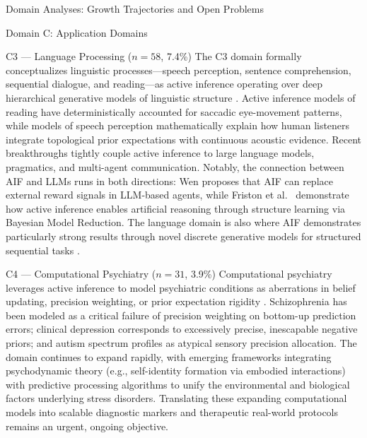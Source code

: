 \documentclass[
  ignorenonframetext,
]{beamer}
\begin{document}
\begin{frame}{Domain Analyses: Growth Trajectories and Open Problems
\label{sec:subfield_analyses}}
\begin{block}{Domain C: Application Domains}
\begin{block}{C3 --- Language Processing (\(n = 58\), 7.4\%)}
\protect{}\label{c3-language-processing-n-58-7.4}
The C3 domain formally conceptualizes linguistic processes---speech
perception, sentence comprehension, sequential dialogue, and
reading---as active inference operating over deep hierarchical
generative models of linguistic structure \citep{friston2020generative}.
Active inference models of reading have deterministically accounted for
saccadic eye-movement patterns, while models of speech perception
mathematically explain how human listeners integrate topological prior
expectations with continuous acoustic evidence. Recent breakthroughs
tightly couple active inference to large language models, pragmatics,
and multi-agent communication. Notably, the connection between AIF and
LLMs runs in both directions: Wen \citep{wen2025missing} proposes that
AIF can replace external reward signals in LLM-based agents, while
Friston et al.~\citep{friston2025active} demonstrate how active
inference enables artificial reasoning through structure learning via
Bayesian Model Reduction. The language domain is also where AIF
demonstrates particularly strong results through novel discrete
generative models for structured sequential tasks
\citep{millidge2024retrospective}.
\end{block}

\begin{block}{C4 --- Computational Psychiatry (\(n = 31\), 3.9\%)}
\protect{}\label{c4-computational-psychiatry-n-31-3.9}
Computational psychiatry leverages active inference to model psychiatric
conditions as aberrations in belief updating, precision weighting, or
prior expectation rigidity \citep{smith2021computational}. Schizophrenia
has been modeled as a critical failure of precision weighting on
bottom-up prediction errors; clinical depression corresponds to
excessively precise, inescapable negative priors; and autism spectrum
profiles as atypical sensory precision allocation. The domain continues
to expand rapidly, with emerging frameworks integrating psychodynamic
theory (e.g., self-identity formation via embodied interactions) with
predictive processing algorithms to unify the environmental and
biological factors underlying stress disorders. Translating these
expanding computational models into scalable diagnostic markers and
therapeutic real-world protocols remains an urgent, ongoing objective.
\end{block}


\end{block}
\end{frame}
\end{document}

